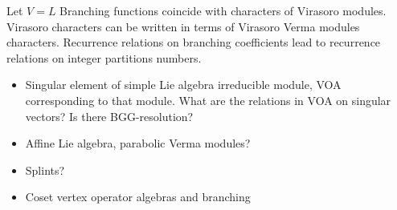 \documentclass[12pt]{article}
\begin{document}
Let $V=L$
Branching functions coincide with characters of Virasoro modules. Virasoro characters can be written in terms of Virasoro Verma modules characters. 
Recurrence relations on branching coefficients lead to recurrence relations on integer partitions numbers.
\begin{itemize}
\item Singular element of simple Lie algebra irreducible module, VOA corresponding to that module.
  What are the relations in VOA on singular vectors? Is there BGG-resolution?
\item Affine Lie algebra, parabolic Verma modules?
\item Splints?
\item Coset vertex operator algebras and branching
\end{itemize}


{}

\end{document}
